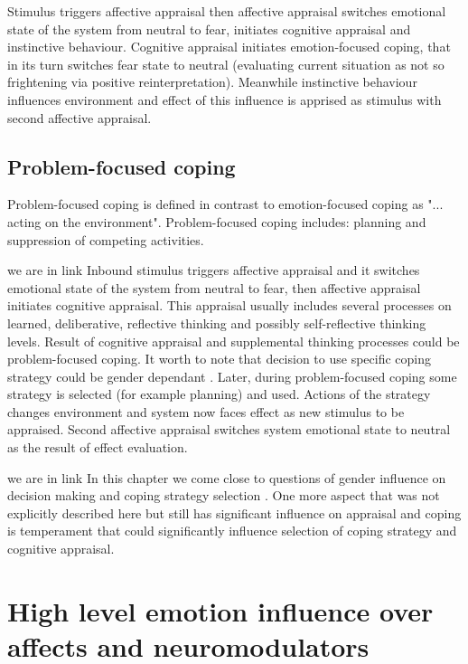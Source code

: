 Stimulus triggers affective appraisal then affective appraisal switches emotional state of the system from neutral to fear, initiates cognitive appraisal and instinctive behaviour. Cognitive appraisal initiates emotion-focused coping, that in its turn switches fear state to neutral (evaluating current situation as not so frightening via positive reinterpretation). Meanwhile instinctive behaviour influences environment and effect of this influence is apprised as stimulus with second affective appraisal.

\subsection{Problem-focused coping}

Problem-focused coping is defined in contrast to emotion-focused coping as "... acting on the environment". Problem-focused coping includes: planning and suppression of competing activities.



we are in link
Inbound stimulus triggers affective appraisal and it switches emotional state of the system from neutral to fear, then affective appraisal initiates cognitive appraisal. This appraisal usually includes several processes on learned, deliberative, reflective thinking and possibly self-reflective thinking levels. Result of cognitive appraisal and supplemental thinking processes could be problem-focused coping. It worth to note that decision to use specific coping strategy could be gender dependant \cite{sex_differencies}. Later, during problem-focused coping some strategy is selected (for example planning) and used. Actions of the strategy changes environment and system now faces effect as new stimulus to be appraised. Second affective appraisal switches system emotional state to neutral as the result of effect evaluation.

we are in link
In this chapter we come close to questions of gender influence on decision making and coping strategy selection \cite{sex_differencies}. One more aspect that was not explicitly described here but still has significant influence on appraisal and coping is temperament that could significantly influence selection of coping strategy and cognitive appraisal.

\section{High level emotion influence over affects and neuromodulators}

